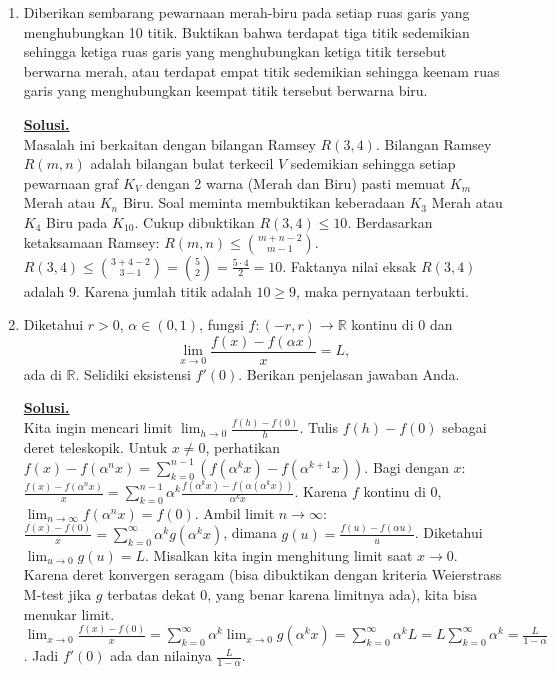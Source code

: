 \documentclass[12pt,twoside]{article}
\newenvironment{solution}
{
	\par\noindent\textbf{\underline{Solusi.}}\\
}
{
	\par
}
\begin{document}
\begin{enumerate}
  \item Diberikan sembarang pewarnaan merah-biru pada setiap ruas garis yang menghubungkan 10 titik. Buktikan bahwa terdapat tiga titik sedemikian sehingga ketiga ruas garis yang menghubungkan ketiga titik tersebut berwarna merah, atau terdapat empat titik sedemikian sehingga keenam ruas garis yang menghubungkan keempat titik tersebut berwarna biru.
        \begin{solution}
          Masalah ini berkaitan dengan bilangan Ramsey $R(3,4)$.
          Bilangan Ramsey $R(m,n)$ adalah bilangan bulat terkecil $V$ sedemikian sehingga setiap pewarnaan graf $K_V$ dengan 2 warna (Merah dan Biru) pasti memuat $K_m$ Merah atau $K_n$ Biru.
          Soal meminta membuktikan keberadaan $K_3$ Merah atau $K_4$ Biru pada $K_{10}$.
          Cukup dibuktikan $R(3,4) \le 10$.
          Berdasarkan ketaksamaan Ramsey:
          $R(m,n) \le \binom{m+n-2}{m-1}$.
          $R(3,4) \le \binom{3+4-2}{3-1} = \binom{5}{2} = \frac{5 \cdot 4}{2} = 10$.
          Faktanya nilai eksak $R(3,4)$ adalah 9.
          Karena jumlah titik adalah $10 \ge 9$, maka pernyataan terbukti.
        \end{solution}

  \item Diketahui $r > 0$, $\alpha \in (0,1)$, fungsi $f : (-r, r) \to \mathbb{R}$ kontinu di $0$ dan
        \[
          \lim_{x \to 0} \frac{f(x) - f(\alpha x)}{x} = L,
        \]
        ada di $\mathbb{R}$. Selidiki eksistensi $f'(0)$. Berikan penjelasan jawaban Anda.
        \begin{solution}
          Kita ingin mencari limit $\lim_{h \to 0} \frac{f(h)-f(0)}{h}$.
          Tulis $f(h) - f(0)$ sebagai deret teleskopik.
          Untuk $x \ne 0$, perhatikan
          $f(x) - f(\alpha^n x) = \sum_{k=0}^{n-1} (f(\alpha^k x) - f(\alpha^{k+1} x))$.
          Bagi dengan $x$:
          $\frac{f(x) - f(\alpha^n x)}{x} = \sum_{k=0}^{n-1} \alpha^k \frac{f(\alpha^k x) - f(\alpha (\alpha^k x))}{\alpha^k x}$.
          Karena $f$ kontinu di 0, $\lim_{n \to \infty} f(\alpha^n x) = f(0)$.
          Ambil limit $n \to \infty$:
          $\frac{f(x) - f(0)}{x} = \sum_{k=0}^{\infty} \alpha^k g(\alpha^k x)$, dimana $g(u) = \frac{f(u)-f(\alpha u)}{u}$.
          Diketahui $\lim_{u \to 0} g(u) = L$.
          Misalkan kita ingin menghitung limit saat $x \to 0$.
          Karena deret konvergen seragam (bisa dibuktikan dengan kriteria Weierstrass M-test jika $g$ terbatas dekat 0, yang benar karena limitnya ada), kita bisa menukar limit.
          $\lim_{x \to 0} \frac{f(x)-f(0)}{x} = \sum_{k=0}^{\infty} \alpha^k \lim_{x \to 0} g(\alpha^k x) = \sum_{k=0}^{\infty} \alpha^k L = L \sum_{k=0}^{\infty} \alpha^k = \frac{L}{1-\alpha}$.
          Jadi $f'(0)$ ada dan nilainya $\frac{L}{1-\alpha}$.
        \end{solution}


\end{enumerate}
\end{document}
